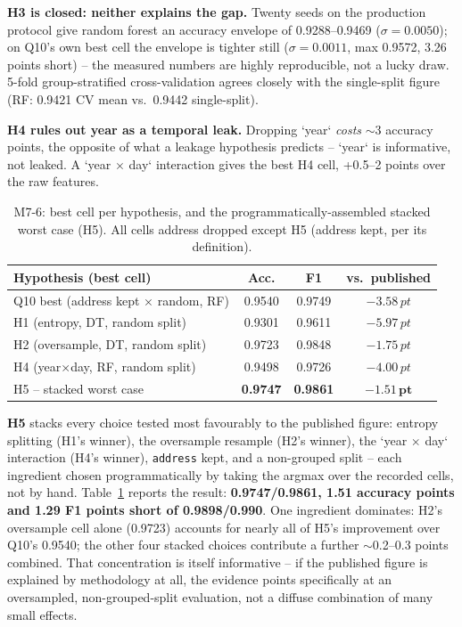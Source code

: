\documentclass[conference]{IEEEtran}
\newcommand{\pt}{\,pt}
\begin{document}
\textbf{H3 is closed: neither explains the gap.} Twenty seeds on the production protocol give
random forest an accuracy envelope of 0.9288--0.9469 ($\sigma=0.0050$); on Q10's own best cell the
envelope is tighter still ($\sigma=0.0011$, max 0.9572, 3.26 points short) -- the measured numbers
are highly reproducible, not a lucky draw. 5-fold group-stratified cross-validation agrees closely
with the single-split figure (RF: 0.9421 CV mean vs.\ 0.9442 single-split).

\textbf{H4 rules out year as a temporal leak.} Dropping `year` \emph{costs} $\sim$3 accuracy
points, the opposite of what a leakage hypothesis predicts -- `year` is informative, not leaked.
A `year $\times$ day` interaction gives the best H4 cell, +0.5--2 points over the raw features.

\begin{table}[t]
\centering
\caption{M7-6: best cell per hypothesis, and the programmatically-assembled stacked worst case
(H5). All cells address dropped except H5 (address kept, per its definition).}
\label{tab:m76}
\footnotesize
\begin{tabular}{lccc}
\hline
\textbf{Hypothesis (best cell)} & \textbf{Acc.} & \textbf{F1} & \textbf{vs.\ published} \\
\hline
Q10 best (address kept $\times$ random, RF) & 0.9540 & 0.9749 & $-3.58\pt$ \\
H1 (entropy, DT, random split) & 0.9301 & 0.9611 & $-5.97\pt$ \\
H2 (oversample, DT, random split) & 0.9723 & 0.9848 & $-1.75\pt$ \\
H4 (year$\times$day, RF, random split) & 0.9498 & 0.9726 & $-4.00\pt$ \\
\hline
H5 -- stacked worst case & \textbf{0.9747} & \textbf{0.9861} & $\mathbf{-1.51\pt}$ \\
\hline
\end{tabular}
\end{table}

\textbf{H5} stacks every choice tested most favourably to the published figure: entropy splitting
(H1's winner), the oversample resample (H2's winner), the `year $\times$ day` interaction (H4's
winner), \texttt{address} kept, and a non-grouped split -- each ingredient chosen
programmatically by taking the argmax over the recorded cells, not by hand. Table~\ref{tab:m76}
reports the result: \textbf{0.9747/0.9861, 1.51 accuracy points and 1.29 F1 points short of
0.9898/0.990}. One ingredient dominates: H2's oversample cell alone (0.9723) accounts for nearly
all of H5's improvement over Q10's 0.9540; the other four stacked choices contribute a further
$\sim$0.2--0.3 points combined. That concentration is itself informative -- if the published
figure is explained by methodology at all, the evidence points specifically at an oversampled,
non-grouped-split evaluation, not a diffuse combination of many small effects.
\end{document}
